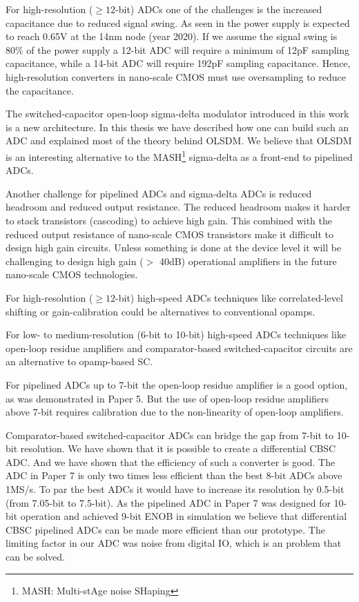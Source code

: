 For high-resolution ($ \ge 12$-bit) ADCs one
of the challenges is the increased capacitance due to reduced signal
swing. As seen in  the power supply is expected
to reach 0.65V at the 14nm node (year 2020). If we assume the signal swing
is 80\% of the power supply a 12-bit ADC will require a minimum of
12pF sampling capacitance, while a 14-bit ADC will require 192pF
sampling capacitance. Hence, high-resolution
converters in nano-scale CMOS must use oversampling to reduce the capacitance. 


The
switched-capacitor open-loop
sigma-delta modulator introduced in this work is a new architecture. In this thesis we have described how one can build such an ADC
and explained most of the theory behind OLSDM.  We believe that OLSDM
is an interesting alternative to the
MASH\footnote{MASH: Multi-stAge noise SHaping} sigma-delta as a
front-end 
to pipelined ADCs.

Another challenge for pipelined ADCs and sigma-delta ADCs is reduced headroom and reduced output resistance. The
reduced headroom makes it harder to stack transistors (cascoding) to
achieve high gain. This combined with the reduced output 
resistance of nano-scale CMOS transistors make it difficult to design
high gain circuits. Unless something is done at the device level it
will be challenging to design high gain ($>$ 40dB) operational
amplifiers in the future nano-scale CMOS technologies. 

For high-resolution ($\ge 12$-bit) high-speed ADCs techniques like
correlated-level shifting \cite{gregoire08} or gain-calibration \cite{mcneill05} could be alternatives
to conventional opamps. 

For low- to medium-resolution (6-bit to 10-bit) high-speed ADCs techniques like open-loop residue amplifiers and comparator-based
switched-capacitor circuits are an alternative to opamp-based SC. 

 For pipelined ADCs up to 7-bit the open-loop residue
amplifier is a good option, as was demonstrated in Paper 5. But the use
of open-loop residue amplifiers above 7-bit requires calibration due to
the non-linearity of open-loop amplifiers. 

Comparator-based switched-capacitor ADCs can bridge the gap from 7-bit to 10-bit resolution.  We have
shown that it is possible to create a differential CBSC ADC. And we
have shown that the efficiency of such a converter is
good. The ADC in Paper 7 is only two times less efficient than the best 8-bit ADCs
above 1MS/s. To par the best ADCs it would have to increase
its resolution by 0.5-bit (from
7.05-bit to 7.5-bit). As the pipelined ADC in Paper 7 was designed for
10-bit operation and achieved 9-bit ENOB in simulation we believe that
differential CBSC pipelined ADCs can be made more efficient than our prototype. The limiting factor
in our ADC was noise from digital IO, which is an problem that can be
solved. 

